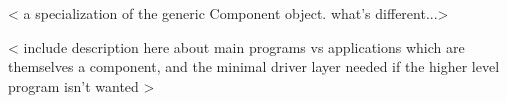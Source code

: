 %


< a specialization of the generic Component object.  what's different...>

< include description here about main programs vs applications which
are themselves a component, and the minimal driver layer needed if
the higher level program isn't wanted >
